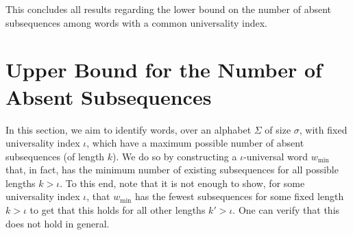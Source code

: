 \documentclass[runningheads,UKenglish,cleveref, autoref, thm-restate]{llncs}
\newif\ifpaper
\begin{document}
This concludes all results regarding the lower bound on the number of absent subsequences among words with a common universality index.



	
	
	\section{Upper Bound for the Number of Absent Subsequences}\label{sec:upbound}
In this section, we aim to identify words, over an alphabet $\Sigma$ of size $\sigma$, with fixed universality index $\iota$, which have a maximum possible number of absent subsequences (of length $k$). We do so by constructing a $\iota$-universal word $w_{\min}$ that, in fact, has the minimum number of existing subsequences for all possible lengths $k>\iota$.
To this end, note that it is not enough to show, for some universality index $\iota$, that $w_{\min}$ has the fewest subsequences for some fixed length $k > \iota$ to get that this holds for all other lengths $k' > \iota$. One can verify that this does not hold in general. %
\ifpaper
\end{document}
